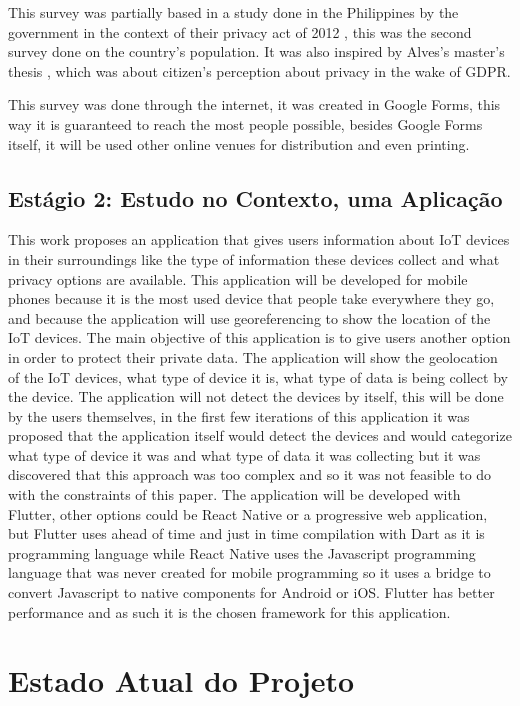 \documentclass[conference]{IEEEtran}
\begin{document}
This survey was partially based in a study done in the Philippines by the
government in the context of their privacy act of 2012 \cite{Philippine2022Conduct},
this was the second survey done on the country's population. It was also
inspired by Alves's master's thesis \cite{alves2021}, which was about citizen's
perception about privacy in the wake of GDPR.

This survey was done through the internet, it was created in Google Forms,
this way it is guaranteed to reach the most people possible, besides Google
Forms itself, it will be used other online venues for distribution and even
printing.

\subsection{Estágio 2: Estudo no Contexto, uma Aplicação}

This work proposes an application that gives users information about IoT
devices in their surroundings like the type of information these devices
collect and what privacy options are available. This application will be
developed for mobile phones because it is the most used device that people
take everywhere they go, and because the application will use georeferencing
to show the location of the IoT devices. The main objective of this application
is to give users another option in order to protect their private data.
The application will show the geolocation of the IoT devices, what type
of device it is, what type of data is being collect by the device. The application
will not detect the devices by itself, this will be done by the users themselves,
in the first few iterations of this application it was proposed that the
application itself would detect the devices and would categorize what type
of device it was and what type of data it was collecting but it was discovered
that this approach was too complex and so it was not feasible to do with
the constraints of this paper. The application will be developed with Flutter,
other options could be React Native or a progressive web application, but
Flutter uses ahead of time and just in time compilation with Dart as it
is programming language while React Native uses the Javascript programming
language that was never created for mobile programming so it uses a bridge
to convert Javascript to native components for Android or iOS. Flutter has
better performance and as such it is the chosen framework for this application.

\section{Estado Atual do Projeto}
\end{document}
